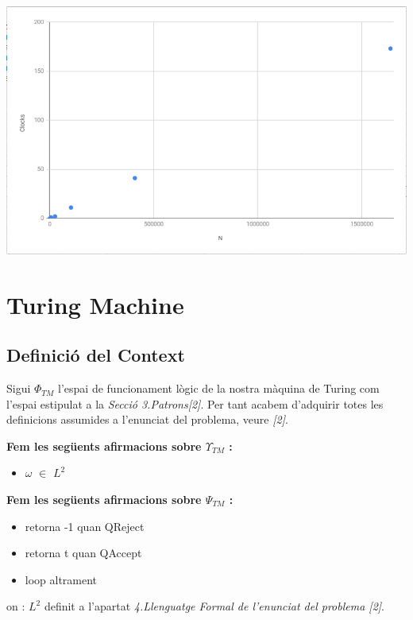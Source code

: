 \documentclass[12pt,a4paper]{report}
\def \w{$\omega$}
\def \contextTM{$\Phi_{TM}$}
\def \preTM{$\Upsilon_{TM}$}
\def \postTM{$\Psi_{TM}$}
\begin{document}
\begin{center}
\includegraphics[width=16cm]{copmlexpda}
\end{center}

\clearpage

\chapter{Turing Machine}

\section{Definició del Context}

Sigui \contextTM{} l'espai de funcionament lògic de la nostra màquina de Turing com l'espai estipulat a la \textit{Secció 3.Patrons[2]}. Per tant acabem d'adquirir totes les definicions assumides a l'enunciat del problema, veure \textit{[2]}.

\textbf{Fem les següents afirmacions sobre \preTM{} :}

\begin{itemize}
\item \w{} $\in$ $L^2$
\end{itemize}

\textbf{Fem les següents afirmacions sobre \postTM{} :}

\begin{itemize}
\item retorna -1 quan QReject
\item retorna t quan QAccept
\item loop altrament
\end{itemize}

on : $L^2$ definit a l'apartat \textit{4.Llenguatge Formal de l'enunciat del problema [2]}.
\end{document}
